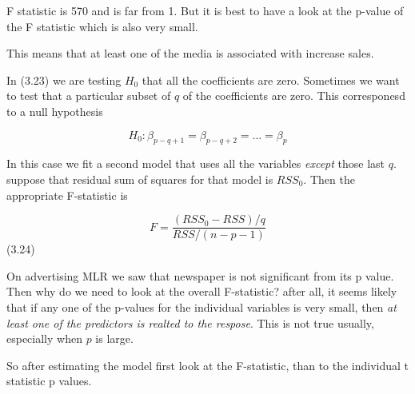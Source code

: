 \documentclass[
  letterpaper,
  DIV=11,
  numbers=noendperiod]{scrreprt}
\begin{document}
F statistic is 570 and is far from 1. But it is best to have a look at
the p-value of the F statistic which is also very small.

This means that at least one of the media is associated with increase
sales.

In (3.23) we are testing \(H_0\) that all the coefficients are zero.
Sometimes we want to test that a particular subset of \(q\) of the
coefficients are zero. This corresponesd to a null hypothesis

\[
  H_0 : \beta_{p-q+1} = \beta_{p-q+2} = \dots = \beta_p
  \]

In this case we fit a second model that uses all the variables
\emph{except} those last \(q\). suppose that residual sum of squares for
that model is \(RSS_0\). Then the appropriate F-statistic is

\[
  F = \frac{(RSS_0 - RSS)/q}{RSS/(n-p-1)}
  \] (3.24)

On advertising MLR we saw that newspaper is not significant from its p
value. Then why do we need to look at the overall F-statistic? after
all, it seems likely that if any one of the p-values for the individual
variables is very small, then \emph{at least one of the predictors is
realted to the respose}. This is not true usually, especially when \(p\)
is large.

So after estimating the model first look at the F-statistic, than to the
individual t statistic p values.
\end{document}
